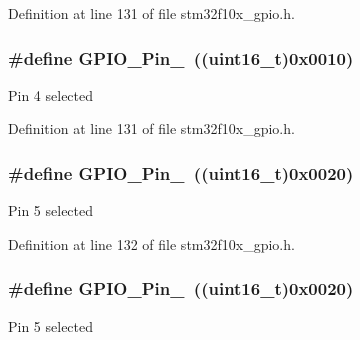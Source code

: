 Definition at line 131 of file stm32f10x\+\_\+gpio.\+h.

\subsubsection[{\texorpdfstring{G\+P\+I\+O\+\_\+\+Pin\+\_\+4}{GPIO_Pin_4}}]{\setlength{\rightskip}{0pt plus 5cm}\#define G\+P\+I\+O\+\_\+\+Pin\+\_~(({\bf uint16\+\_\+t})0x0010)}\hypertarget{group___g_p_i_o__pins__define_gacbf04d09b954606cdcc55eb2e81780e3}{}\label{group___g_p_i_o__pins__define_gacbf04d09b954606cdcc55eb2e81780e3}
Pin 4 selected 

Definition at line 131 of file stm32f10x\+\_\+gpio.\+h.

\subsubsection[{\texorpdfstring{G\+P\+I\+O\+\_\+\+Pin\+\_\+5}{GPIO_Pin_5}}]{\setlength{\rightskip}{0pt plus 5cm}\#define G\+P\+I\+O\+\_\+\+Pin\+\_~(({\bf uint16\+\_\+t})0x0020)}\hypertarget{group___g_p_i_o__pins__define_ga32dbe930f52ce5ab60190c65e9dc741e}{}\label{group___g_p_i_o__pins__define_ga32dbe930f52ce5ab60190c65e9dc741e}
Pin 5 selected 

Definition at line 132 of file stm32f10x\+\_\+gpio.\+h.

\subsubsection[{\texorpdfstring{G\+P\+I\+O\+\_\+\+Pin\+\_\+5}{GPIO_Pin_5}}]{\setlength{\rightskip}{0pt plus 5cm}\#define G\+P\+I\+O\+\_\+\+Pin\+\_~(({\bf uint16\+\_\+t})0x0020)}\hypertarget{group___g_p_i_o__pins__define_ga32dbe930f52ce5ab60190c65e9dc741e}{}\label{group___g_p_i_o__pins__define_ga32dbe930f52ce5ab60190c65e9dc741e}
Pin 5 selected 

